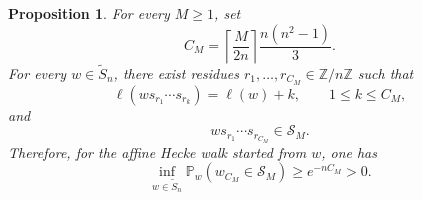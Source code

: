\documentclass[11pt,a4paper]{amsart}
\newtheorem{proposition}[theorem]{Proposition}
\theoremstyle{definition}
\theoremstyle{remark}
\numberwithin{equation}{section}
\newcommand{\Z}{\mathbb Z}
\newcommand{\Pp}{\mathbb P}
\newcommand{\wtS}{\widetilde S_n}
\newcommand{\cS}{\mathcal S}
\newcommand{\ceil}[1]{\left\lceil #1\right\rceil}
\begin{document}
	\begin{proposition}\label{prop:reach-separated}
		For every $M\ge1$, set
		\begin{equation}\label{eq:CM-explicit}
			C_M=\ceil{\frac{M}{2n}}\frac{n(n^2-1)}{3}.
		\end{equation}
		For every $w\in\wtS$, there exist residues
		$r_1,\ldots,r_{C_M}\in\Z/n\Z$ such that
		\begin{equation}\label{eq:increasing-path}
			\ell(ws_{r_1}\cdots s_{r_k})=\ell(w)+k,
			\qquad 1\le k\le C_M,
		\end{equation}
		and
		\begin{equation}\label{eq:path-reaches-SM}
			ws_{r_1}\cdots s_{r_{C_M}}\in\cS_M.
		\end{equation}
		Therefore, for the affine Hecke walk started from $w$, one has
		\begin{equation}\label{eq:uniform-reach-probability}
			\inf_{w\in\wtS}\Pp_w(w_{C_M}\in\cS_M)
			\ge e^{-nC_M}>0.
		\end{equation}
	\end{proposition}
	
\end{document}
